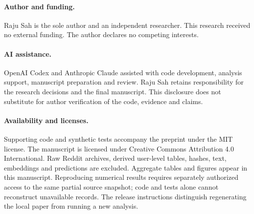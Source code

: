 \documentclass[10pt,twocolumn]{article}
\begin{document}
\paragraph{Author and funding.} Raju Sah is the sole author and an independent researcher. This research received no external funding. The author declares no competing interests.
\paragraph{AI assistance.} OpenAI Codex and Anthropic Claude assisted with code development, analysis support, manuscript preparation and review. Raju Sah retains responsibility for the research decisions and the final manuscript. This disclosure does not substitute for author verification of the code, evidence and claims.
\paragraph{Availability and licenses.} Supporting code and synthetic tests accompany the preprint under the MIT license. The manuscript is licensed under Creative Commons Attribution 4.0 International. Raw Reddit archives, derived user-level tables, hashes, text, embeddings and predictions are excluded. Aggregate tables and figures appear in this manuscript. Reproducing numerical results requires separately authorized access to the same partial source snapshot; code and tests alone cannot reconstruct unavailable records. The release instructions distinguish regenerating the local paper from running a new analysis.
\end{document}
